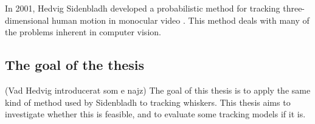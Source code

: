 In 2001, Hedvig Sidenbladh developed a probabilistic method for tracking three-dimensional human motion in monocular video \cite{Hedvig}. This method deals with many of the problems inherent in computer vision.

\subsection{The goal of the thesis}

(Vad Hedvig introducerat som e najz) The goal of this thesis is to apply the same kind of method used by Sidenbladh to tracking whiskers. This thesis aims to investigate whether this is feasible, and to evaluate some tracking models if it is.

